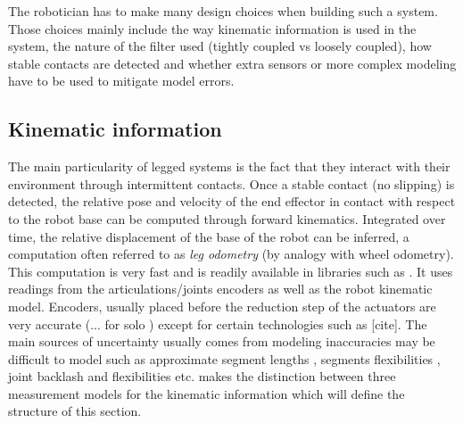 The robotician has to make many design choices when building such a system. Those choices mainly include the way kinematic information is used in the system, 
the nature of the filter used (tightly coupled vs loosely coupled), how stable contacts are detected and whether extra sensors or more complex modeling have 
to be used to mitigate model errors.
 

\subsection{Kinematic information}
The main particularity of legged systems is the fact that they interact with their environment through intermittent contacts.
Once a stable contact (no slipping) is detected, the relative pose and velocity of the end effector in contact with respect to the robot base 
can be computed through forward kinematics. Integrated over time, the relative displacement of the base of the robot can be inferred, a computation 
often referred to as \textit{leg odometry} (by analogy with wheel odometry). This computation is very fast and is readily available in libraries such as \cite{carpentier2019pinocchio, hereid2017frost}. It uses
readings from the articulations/joints encoders as well as the robot kinematic model. Encoders, usually placed before the reduction step of the actuators
are very accurate (... for solo \cite{grimminger2020open}) except for certain technologies such as [cite]. The main sources of uncertainty usually comes from
modeling inaccuracies may be difficult to model such as approximate segment lengths , segments flexibilities \cite{vigne2018estimation}, 
joint backlash \cite{fallon2014drift} and flexibilities \cite{koolen2016design} etc. \cite{bloesch2018technical} makes the distinction between three measurement models for the kinematic information which will define the structure of this section. 


